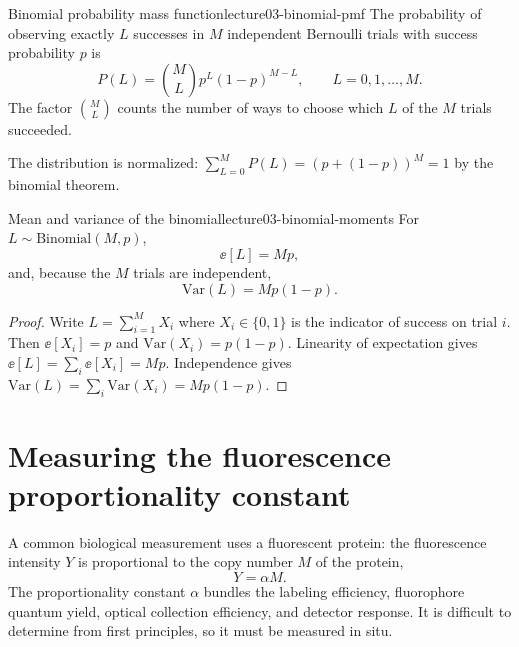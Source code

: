 \begin{definition}{Binomial probability mass function}{lecture03-binomial-pmf}
The probability of observing exactly $L$ successes in $M$ independent Bernoulli trials with success probability $p$ is
\begin{equation}\label{eq:lecture03-binomial-pmf}
P(L) = \binom{M}{L} p^{L} (1-p)^{M-L},\qquad L=0,1,\ldots,M .
\end{equation}
The factor $\binom{M}{L}$ counts the number of ways to choose which $L$ of the $M$ trials succeeded.
\end{definition}

The distribution is normalized: $\sum_{L=0}^{M} P(L) = (p+(1-p))^{M} = 1$ by the binomial theorem.

\begin{proposition}{Mean and variance of the binomial}{lecture03-binomial-moments}
For $L\sim\mathrm{Binomial}(M,p)$,
\begin{equation}\label{eq:lecture03-binomial-mean}
\ee[L] = M p,
\end{equation}
and, because the $M$ trials are independent,
\begin{equation}\label{eq:lecture03-binomial-var}
\mathrm{Var}(L) = M p (1-p).
\end{equation}
\end{proposition}

\begin{proof}
Write $L = \sum_{i=1}^{M} X_i$ where $X_i\in\{0,1\}$ is the indicator of success on trial $i$. Then $\ee[X_i]=p$ and $\mathrm{Var}(X_i)=p(1-p)$. Linearity of expectation gives $\ee[L]=\sum_i\ee[X_i]=Mp$. Independence gives $\mathrm{Var}(L)=\sum_i\mathrm{Var}(X_i)=Mp(1-p)$.
\end{proof}

\section{Measuring the fluorescence proportionality constant}\label{sec:lecture03-fluorescence}

A common biological measurement uses a fluorescent protein: the fluorescence intensity $Y$ is proportional to the copy number $M$ of the protein,
\begin{equation}\label{eq:lecture03-fluorescence}
Y = \alpha M .
\end{equation}
The proportionality constant $\alpha$ bundles the labeling efficiency, fluorophore quantum yield, optical collection efficiency, and detector response. It is difficult to determine from first principles, so it must be measured in situ.

